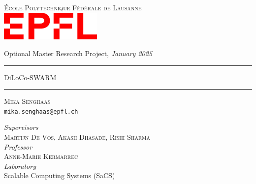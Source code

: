 \documentclass{article}
\begin{document}
\begin{titlepage}
\begin{center}
    \Large{\textsc{École Polytechnique Fédérale de Lausanne}}\\
    \vspace{1cm}
    \includegraphics[width=5cm]{figures/epfl.png}
    \vspace{1cm}
    
    \large{Optional Master Research Project, \textit{January 2025}}\\
    
    \vspace{1cm}
    \rule{\textwidth}{1pt}\vspace{15pt}
    \Huge{DiLoCo-SWARM}
    \rule{\textwidth}{1pt}
    
    \vspace{1cm}
    
    \large{\textsc{Mika Senghaas}\\\texttt{mika.senghaas@epfl.ch}}
    
    \large{
      \textit{Supervisors}\\
      \textsc{Martijn De Vos}, \textsc{Akash Dhasade}, \textsc{Rishi Sharma}}\\
      \vspace{0.5cm}
      \textit{Professor}\\
      \textsc{Anne-Marie Kermarrec}\\
      \vspace{0.5cm}
      \large{\textit{Laboratory}\\
      Scalable Computing Systems (SaCS)\\
    }
\end{center}
\end{titlepage}

\end{document}
